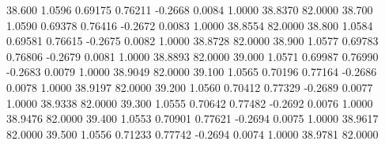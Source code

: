   38.600   1.0596   0.69175   0.76211  -0.2668   0.0084   1.0000  38.8370  82.0000
  38.700   1.0590   0.69378   0.76416  -0.2672   0.0083   1.0000  38.8554  82.0000
  38.800   1.0584   0.69581   0.76615  -0.2675   0.0082   1.0000  38.8728  82.0000
  38.900   1.0577   0.69783   0.76806  -0.2679   0.0081   1.0000  38.8893  82.0000
  39.000   1.0571   0.69987   0.76990  -0.2683   0.0079   1.0000  38.9049  82.0000
  39.100   1.0565   0.70196   0.77164  -0.2686   0.0078   1.0000  38.9197  82.0000
  39.200   1.0560   0.70412   0.77329  -0.2689   0.0077   1.0000  38.9338  82.0000
  39.300   1.0555   0.70642   0.77482  -0.2692   0.0076   1.0000  38.9476  82.0000
  39.400   1.0553   0.70901   0.77621  -0.2694   0.0075   1.0000  38.9617  82.0000
  39.500   1.0556   0.71233   0.77742  -0.2694   0.0074   1.0000  38.9781  82.0000
